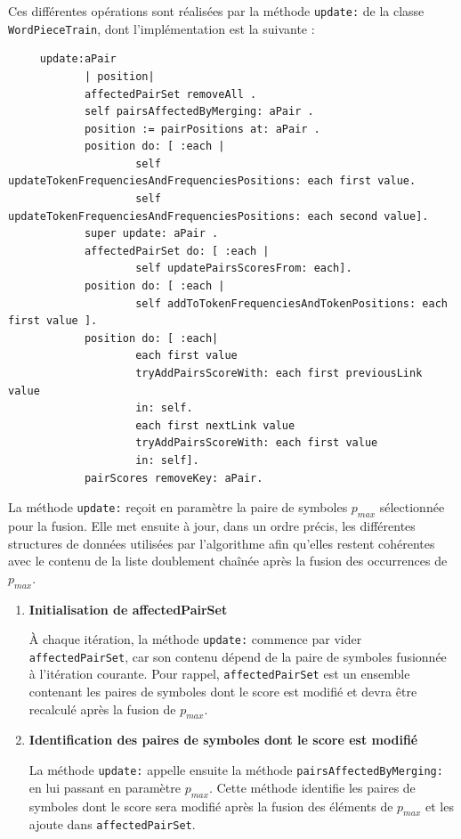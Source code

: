 \documentclass[12pt,a4paper]{report}
\begin{document}
\begin{enumerate}
	 Ces différentes opérations sont réalisées par la méthode \texttt{update:} de la classe \texttt{WordPieceTrain}, dont l'implémentation est la suivante :
	 
	 \begin{verbatim}
	 update:aPair
	 		| position|
	 		affectedPairSet removeAll .
	 		self pairsAffectedByMerging: aPair .
	 		position := pairPositions at: aPair .
	 		position do: [ :each |
	 				self updateTokenFrequenciesAndFrequenciesPositions: each first value.
	 				self updateTokenFrequenciesAndFrequenciesPositions: each second value].
	 		super update: aPair .
	 		affectedPairSet do: [ :each |
	 				self updatePairsScoresFrom: each].
	 		position do: [ :each |
	 				self addToTokenFrequenciesAndTokenPositions: each first value ].
	 		position do: [ :each|
	 				each first value
	 				tryAddPairsScoreWith: each first previousLink value
	 				in: self.
	 				each first nextLink value
	 				tryAddPairsScoreWith: each first value
	 				in: self].
	 		pairScores removeKey: aPair.
	 \end{verbatim}
	 
	 La méthode \texttt{update:} reçoit en paramètre la paire de symboles $p_{max}$ sélectionnée pour la fusion. Elle met ensuite à jour, dans un ordre précis, les différentes structures de données utilisées par l'algorithme afin qu'elles restent cohérentes avec le contenu de la liste doublement chaînée après la fusion des occurrences de $p_{max}$.
	 
	 \begin{enumerate}[label=\alph*)]
	 	\item \textbf{Initialisation de affectedPairSet}
	 	
	 	À chaque itération, la méthode \texttt{update:} commence par vider \texttt{affectedPairSet}, car son contenu dépend de la paire de symboles fusionnée à l'itération courante. Pour rappel, \texttt{affectedPairSet} est un ensemble contenant les paires de symboles dont le score est modifié et devra être recalculé après la fusion de $p_{max}$.
	 	
	 	\item \textbf{Identification des paires de symboles dont le score est modifié}
	 	
	 	La méthode \texttt{update:} appelle ensuite la méthode \texttt{pairsAffectedByMerging:} en lui passant en paramètre $p_{max}$. Cette méthode identifie les paires de symboles dont le score sera modifié après la fusion des éléments de $p_{max}$ et les ajoute dans \texttt{affectedPairSet}.
	 	

\end{enumerate}
\end{enumerate}
\end{document}
